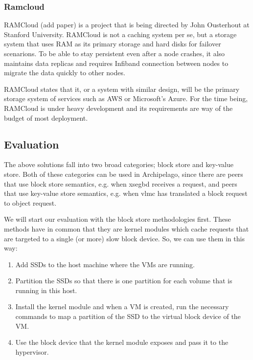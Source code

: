 \subsubsection{Ramcloud}

RAMCloud (\fixme add paper) is a project that is being directed by John 
Ousterhout at Stanford University. RAMCloud is not a caching system per se, but 
a storage system that uses RAM as its primary storage and hard disks for 
failover scenarions. To be able to stay persistent even after a node crashes, 
it also maintains data replicas and requires Infiband connection between nodes 
to migrate the data quickly to other nodes.

RAMCloud states that it, or a system with similar design, will be the primary 
storage system of services such as AWS or Microsoft's Azure. For the time 
being, RAMCloud is under heavy development and its requirements are way of the 
budget of most deployment.


\subsection{Evaluation}

The above solutions fall into two broad categories; block store and key-value 
store. Both of these categories can be used in Archipelago, since there are 
peers that use block store semantics, e.g.  when xsegbd receives a request, and 
peers that use key-value store semantics, e.g.  when vlmc has translated a 
block request to object request.

We will start our evaluation with the block store methodologies first. These 
methods have in common that they are kernel modules which cache requests that 
are targeted to a single (or more) slow block device. So, we can use them in 
this way:

\begin{enumerate}
	\item Add SSDs to the host machine where the VMs are running.
	\item Partition the SSDs so that there is one partition for each volume 
		that is running in this host.
	\item Install the kernel module and when a VM is created, run the necessary 
		commands to map a partition of the SSD to the virtual block device of 
		the VM.
	\item Use the block device that the kernel module exposes and pass it to 
		the hypervisor.
\end{enumerate}

